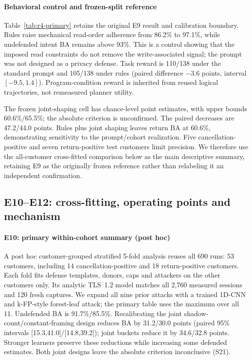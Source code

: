\paragraph{Behavioral control and frozen-split reference}
Table~\ref{tab:r4-primary} retains the original E9 result and calibration boundary. Rules raise mechanical read-order adherence from 86.2\% to 97.1\%, while undefended intent BA remains above 93\%. This is a control showing that the imposed read constraints do not remove the write-associated signal; the prompt was not designed as a privacy defense. Task reward is 110/138 under the standard prompt and 105/138 under rules (paired difference $-3.6$ points, interval $[-9.5,1.4]$). Program-condition reward is inherited from reused logical trajectories, not remeasured planner utility.

The frozen joint-shaping cell has chance-level point estimates, with upper bounds 60.6\%/65.5\%; the absolute criterion is unconfirmed. The paired decreases are 47.2/44.0 points. Rules plus joint shaping leaves return BA at 60.6\%, demonstrating sensitivity to the prompt/cohort realization. Five cancellation-positive and seven return-positive test customers limit precision. We therefore use the all-customer cross-fitted comparison below as the main descriptive summary, retaining E9 as the originally frozen reference rather than relabeling it an independent confirmation.

\subsection{E10--E12: cross-fitting, operating points and mechanism}\label{sec:r5}
\paragraph{E10: primary within-cohort summary (post hoc)}
A post hoc customer-grouped stratified 5-fold analysis reuses all 690 runs: 53 customers, including 14 cancellation-positive and 18 return-positive customers. Each fold fits defense templates, donors, caps and attackers on the other customers only. Its analytic TLS~1.2 model matches all 2,760 measured sessions and 120 fresh captures. We expand all nine prior attacks with a trained 1D-CNN and k-FP-style forest-leaf attack; the primary table uses the maximum over all 11. Undefended BA is 91.7\%/85.5\%. Recalibrating the joint shadow-count/constant-framing design reduces BA by 31.2/30.0 points (paired 95\% intervals [15.3,41.0]/[14.8,39.2]); joint buckets reduce it by 34.6/32.8 points. Stronger learners preserve these reductions while increasing some defended estimates. Both joint designs leave the absolute criterion inconclusive (S21).

